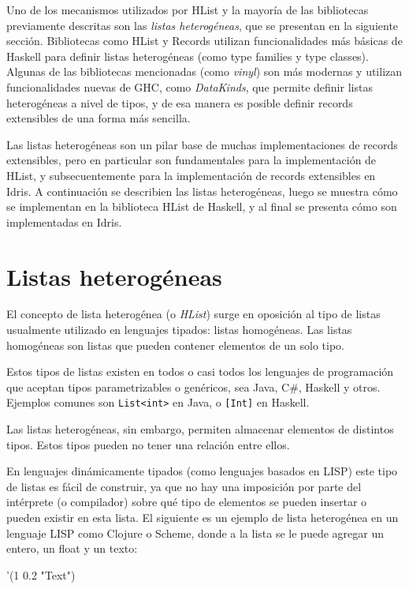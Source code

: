 Uno de los mecanismos utilizados por HList y la mayoría de las bibliotecas previamente descritas son las \textit{listas heterogéneas}, que se presentan en la siguiente sección. Bibliotecas como HList y Records \cite{HaskellRecords} utilizan funcionalidades más básicas de Haskell para definir listas heterogéneas (como type families y type classes). Algunas de las bibliotecas mencionadas (como \textit{vinyl}) son más modernas y utilizan funcionalidades nuevas de GHC, como \textit{DataKinds}, que permite definir listas heterogéneas a nivel de tipos, y de esa manera es posible definir records extensibles de una forma más sencilla.

Las listas heterogéneas son un pilar base de muchas implementaciones de records extensibles, pero en particular son fundamentales para la implementación de HList, y subsecuentemente para la implementación de records extensibles en Idris. A continuación se describien las listas heterogéneas, luego se muestra cómo se implementan en la biblioteca HList de Haskell, y al final se presenta cómo son implementadas en Idris.

\section{Listas heterogéneas}

El concepto de lista heterogénea (o \textit{HList}) surge en oposición al tipo de listas usualmente utilizado en lenguajes tipados: listas homogéneas. Las listas homogéneas son listas que pueden contener elementos de un solo tipo.

Estos tipos de listas existen en todos o casi todos los lenguajes de programación que aceptan tipos parametrizables o genéricos, sea Java, C\#, Haskell y otros. Ejemplos comunes son \texttt{List<int>} en Java, o \texttt{[Int]} en Haskell.

Las listas heterogéneas, sin embargo, permiten almacenar elementos de distintos tipos. Estos tipos pueden no tener una relación entre ellos.

En lenguajes dinámicamente tipados (como lenguajes basados en LISP) este tipo de listas es fácil de construir, ya que no hay una imposición por parte del intérprete (o compilador) sobre qué tipo de elementos se pueden insertar o pueden existir en esta lista. El siguiente es un ejemplo de lista heterogénea en un lenguaje LISP como Clojure o Scheme, donde a la lista se le puede agregar un entero, un float y un texto:

\begin{code}
'(1 0.2 "Text")
\end{code}

